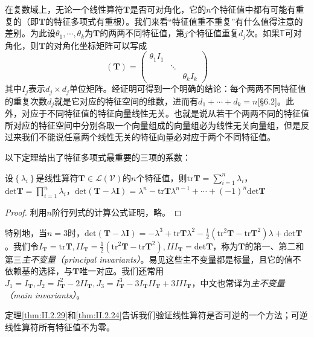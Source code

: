 \documentclass[main.tex]{subfiles}
\begin{document}
在复数域上，无论一个线性算符$\mathbf{T}$是否可对角化，它的$n$个特征值中都有可能有重复的（即$\mathbf{T}$的特征多项式有重根）。我们来看“特征值重不重复”有什么值得注意的差别。为此设$\theta_1,\cdots,\theta_k$为$\mathbf{T}$的两两不同特征值，第$j$个特征值重复$d_j$次。如果$\mathbb{T}$可对角化，则$\mathbf{T}$的对角化坐标矩阵可以写成
\[\left(\mathbf{T}\right)=\left(\begin{array}{ccc}\theta_1I_1&&\\&\ddots&\\&&\theta_kI_k\end{array}\right)\]
其中$I_j$表示$d_j\times d_j$单位矩阵。经证明可得到一个明确的结论：每个两两不同特征值的重复次数$d_j$就是它对应的特征空间的维数，进而有$d_1+\cdots+d_k=n$[\S 6.2]\cite{Hoffman1971}。此外，对应于不同特征值的特征向量线性无关。也就是说从若干个两两不同的特征值所对应的特征空间中分别各取一个向量组成的向量组必为线性无关向量组\cite[\S 5.1 性质1.4]{周胜林2012线性代数}，但是反过来我们不能说任意两个线性无关的特征向量必对应于两个不同特征值。

以下定理\cite[\S 5.1 性质1.1、1.2]{周胜林2012线性代数}给出了特征多项式最重要的三项的系数：

\begin{theorem}\label{thm:II.2.29}
    设$\left\{\lambda_i\right\}$是线性算符$\mathbf{T}\in\mathcal{L}\left(\mathcal{V}\right)$的$n$个特征值，则$\mathrm{tr}\mathbf{T}=\sum_{i=1}^n\lambda_i$，$\mathrm{det}\mathbf{T}=\prod_{i=1}^n\lambda_i$，$\mathrm{det}\left(\mathbf{T}-\lambda\mathbf{I}\right)=\lambda^n-\mathrm{tr}\mathbf{T}\lambda^{n-1}+\cdots+\left(-1\right)^n\mathrm{det}\mathbf{T}$
\end{theorem}
\begin{proof}
    利用$n$阶行列式的计算公式证明，略。
\end{proof}

特别地，当$n=3$时，$\mathrm{det}\left(\mathbf{T}-\lambda\mathbf{I}\right)=-\lambda^3+\mathrm{tr}\mathbf{T}\lambda^2-\frac{1}{2}\left(\mathrm{tr}^2\mathbf{T}-\mathrm{tr}\mathbf{T}^2\right)\lambda+\mathrm{det}\mathbf{T}$。我们令$I_\mathbf{T}=\mathrm{tr}\mathbf{T},II_\mathbf{T}=\frac{1}{2}\left(\mathrm{tr}^2\mathbf{T}-\mathrm{tr}\mathbf{T}^2\right),III_\mathbf{T}=\mathrm{det}\mathbf{T}$，称为$\mathbf{T}$的第一、第二和第三\emph{主不变量（principal invariants）}。易见这些主不变量都是标量，且它的值不依赖基的选择，与$\mathbf{T}$唯一对应。我们还常用$J_1=I_\mathbf{T},J_2=I_\mathbf{T}^2-2II_\mathbf{T},J_3=I_\mathbf{T}^3-3I_\mathbf{T}II_\mathbf{T}+3III_\mathbf{T}$，中文也常译为\emph{主不变量（main invariants）}。

定理\ref{thm:II.2.29}和\ref{thm:II.2.24}告诉我们验证线性算符是否可逆的一个方法；可逆线性算符所有特征值不为零。
\end{document}
